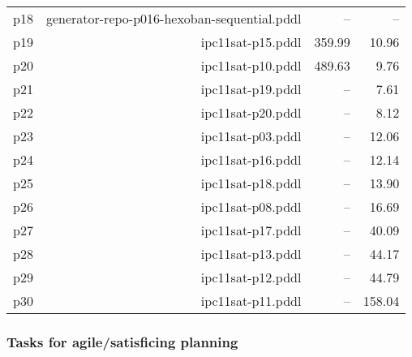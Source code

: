\documentclass{article}
\begin{document}
\begin{center}
\begin{tabular}{@{}l|r|r|r@{}}
  p18& generator-repo-p016-hexoban-sequential.pddl&--&--\\
  p19& ipc11sat-p15.pddl&359.99&10.96\\
  p20& ipc11sat-p10.pddl&489.63&9.76\\
  p21& ipc11sat-p19.pddl&--&7.61\\
  p22& ipc11sat-p20.pddl&--&8.12\\
  p23& ipc11sat-p03.pddl&--&12.06\\
  p24& ipc11sat-p16.pddl&--&12.14\\
  p25& ipc11sat-p18.pddl&--&13.90\\
  p26& ipc11sat-p08.pddl&--&16.69\\
  p27& ipc11sat-p17.pddl&--&40.09\\
  p28& ipc11sat-p13.pddl&--&44.17\\
  p29& ipc11sat-p12.pddl&--&44.79\\
  p30& ipc11sat-p11.pddl&--&158.04
                            \end{tabular}
                            \end{center}
                    

                    \subsubsection*{Tasks for agile/satisficing planning}
                    
\end{document}
